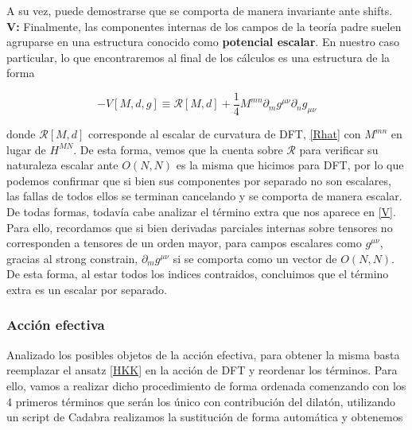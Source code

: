 \documentclass{article}
\numberwithin{equation}{section}
\begin{document}
A su vez, puede demostrarse que se comporta de manera invariante ante shifts.\\

\textbf{V:} Finalmente, las componentes internas de los campos de la teoría padre suelen agruparse en una estructura conocido como \textbf{potencial escalar}. En nuestro caso particular, lo que encontraremos al final de los cálculos es una estructura de la forma

\begin{equation}\label{V}
-V[M,d,g] \equiv \mathcal{R}[M,d] + \frac{1}{4} M^{m n} \partial_m g^{\mu \nu} \partial_n g_{\mu \nu}
\end{equation}

donde $ \mathcal{R}[M,d] $ corresponde al escalar de curvatura de DFT, \ref{Rhat} con $ M^{m n} $ en lugar de $ H^{M N} $. De esta forma, vemos que la cuenta sobre $ \mathcal{R} $ para verificar su naturaleza escalar ante $ O(N,N) $ es la misma que hicimos para DFT, por lo que podemos confirmar que si bien sus componentes por separado no son escalares, las fallas de todos ellos se terminan cancelando y se comporta de manera escalar. De todas formas, todavía cabe analizar el término extra que nos aparece en \ref{V}. Para ello, recordamos que si bien derivadas parciales internas sobre tensores no corresponden a tensores de un orden mayor, para campos escalares como $ g^{\mu \nu} $, gracias al strong constrain, $ \partial_m g^{\mu \nu} $ si se comporta como un vector de $ O(N,N) $. De esta forma, al estar todos los indices contraidos, concluimos que el término extra es un escalar por separado.\\

\subsubsection{Acción efectiva}

Analizado los posibles objetos de la acción efectiva, para obtener la misma basta reemplazar el ansatz \ref{HKK} en la acción de DFT y reordenar los términos. Para ello, vamos a realizar dicho procedimiento de forma ordenada comenzando con los 4 primeros términos que serán los único con contribución del dilatón, utilizando un script de Cadabra realizamos la sustitución de forma automática y obtenemos
\end{document}
